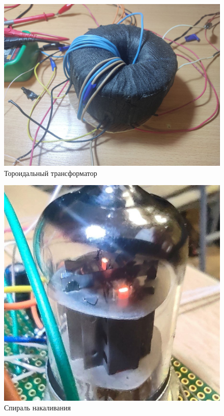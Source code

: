 \begin{figure}[h!p]
    \centering
    \includegraphics[scale=0.35]{photo3.jpg}
    \caption{Тороидальный трансформатор}
    \label{fig:transformator}
\end{figure}

\begin{figure}[h!p]
    \centering
    \includegraphics[scale=0.4]{photo1.jpg}
    \caption{Спираль накаливания}
    \label{fig:lamp}
\end{figure}

